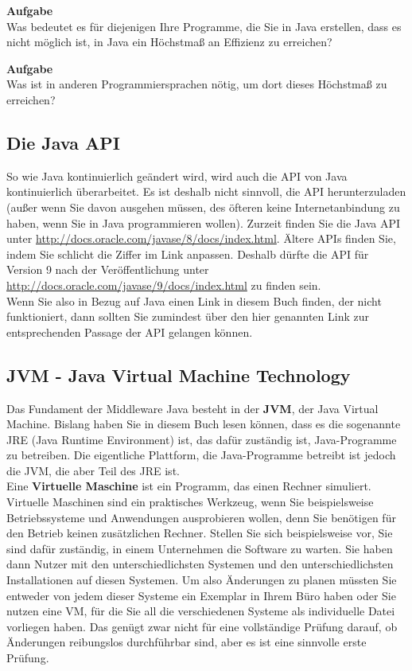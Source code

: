 \textbf{Aufgabe}\\

Was bedeutet es für diejenigen Ihre Programme, die Sie in Java erstellen, dass es nicht möglich ist, in Java ein Höchstmaß an Effizienz zu erreichen? 

\textbf{Aufgabe}\\

Was ist in anderen Programmiersprachen nötig, um dort dieses Höchstmaß zu erreichen?

\subsection{Die Java API}

So wie Java kontinuierlich geändert wird, wird auch die API von Java kontinuierlich überarbeitet. Es ist deshalb nicht sinnvoll, die API herunterzuladen (außer wenn Sie davon ausgehen müssen, des öfteren keine Internetanbindung zu haben, wenn Sie in Java programmieren wollen). Zurzeit finden Sie die Java API unter \url{http://docs.oracle.com/javase/8/docs/index.html}. Ältere APIs finden Sie, indem Sie schlicht die Ziffer im Link anpassen. Deshalb dürfte die API für Version 9 nach der Veröffentlichung unter \url{http://docs.oracle.com/javase/9/docs/index.html} zu finden sein.\\

Wenn Sie also in Bezug auf Java einen Link in diesem Buch finden, der nicht funktioniert, dann sollten Sie zumindest über den hier genannten Link zur entsprechenden Passage der API gelangen können.

\subsection{JVM - Java Virtual Machine Technology}

Das Fundament der Middleware Java besteht in der \textbf{JVM}, der Java Virtual Machine. Bislang haben Sie in diesem Buch lesen können, dass es die sogenannte JRE (Java Runtime Environment) ist, das dafür zuständig ist, Java-Programme zu betreiben. Die eigentliche Plattform, die Java-Programme betreibt ist jedoch die JVM, die aber Teil des JRE ist.\\

Eine \textbf{Virtuelle Maschine} ist ein Programm, das einen Rechner simuliert. Virtuelle Maschinen sind ein praktisches Werkzeug, wenn Sie beispielsweise Betriebssysteme und Anwendungen ausprobieren wollen, denn Sie benötigen für den Betrieb keinen zusätzlichen Rechner. Stellen Sie sich beispielsweise vor, Sie sind dafür zuständig, in einem Unternehmen die Software zu warten. Sie haben dann Nutzer mit den unterschiedlichsten Systemen und den unterschiedlichsten Installationen auf diesen Systemen. Um also Änderungen zu planen müssten Sie entweder von jedem dieser Systeme ein Exemplar in Ihrem Büro haben oder Sie nutzen eine VM, für die Sie all die verschiedenen Systeme als individuelle Datei vorliegen haben. Das genügt zwar nicht für eine vollständige Prüfung darauf, ob Änderungen reibungslos durchführbar sind, aber es ist eine sinnvolle erste Prüfung.\\

